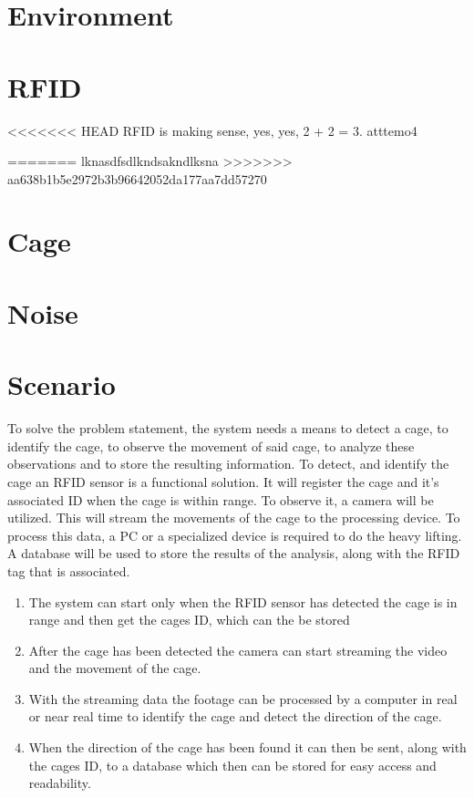 \section{Environment}

\section{RFID}
<<<<<<< HEAD
RFID is making sense, yes, yes, 2 + 2 = 3.
atttemo4

=======
lknasdfsdlkndsakndlksna
>>>>>>> aa638b1b5e2972b3b96642052da177aa7dd57270

\section{Cage}

\section{Noise}

\section{Scenario}

To solve the problem statement, the system needs a means to detect a cage, to identify the cage, to observe the movement of said cage, to analyze these observations and to store the resulting information. To detect, and identify the cage an RFID sensor is a functional solution. It will register the cage and it's associated ID when the cage is within range. To observe it, a camera will be utilized. This will stream the movements of the cage to the processing device. To process this data, a PC or a specialized device is required to do the heavy lifting. A database will be used to store the results of the analysis, along with the RFID tag that is associated.

\begin{enumerate}
    \item The system can start only when the RFID sensor has detected the cage is in range and then get the cages ID, which can the be stored
    \item After the cage has been detected the camera can start streaming the video and the movement of the cage.
    \item With the streaming data the footage can be processed by a computer in real or near real time to identify the cage and detect the direction of the cage.
    \item When the direction of the cage has been found it can then be sent, along with the cages ID, to a database which then can be stored for easy access and readability.
\end{enumerate}


